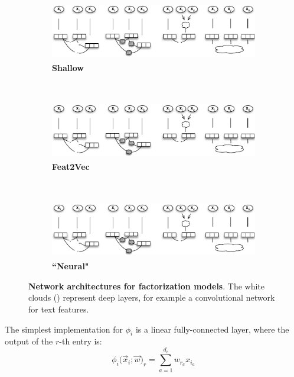 \documentclass{article}
\newcommand{\vect}[1]{\vec{#1}}
\begin{document}
\begin{figure}[th]
    \centering
    \begin{subfigure}[t]{0.26\textwidth}
        \centering
        \includegraphics[height=1in]{img/diagram_mf.pdf}
        \caption{\textbf{Shallow}}
    \end{subfigure}%
    ~
    \begin{subfigure}[t]{0.26\textwidth}
        \centering
        \includegraphics[height=1in]{img/diagram_in.pdf}
        \caption{\textbf{Feat2Vec}}
    \end{subfigure}
    ~
    \begin{subfigure}[t]{0.22\textwidth}
        \centering
        \includegraphics[height=1in]{img/diagram_nmf.pdf}
        \caption{\textbf{``Neural"} \label{fig:neural}}
    \end{subfigure}
    \caption{\textbf{Network architectures for factorization models}.  The  white clouds (\Cloud) represent deep layers, for example a convolutional network for text features.
    \label{fig:architecture}
    }
\end{figure}



The simplest   implementation for $\phi_i$ is a linear fully-connected layer, where the output of the $r$-th entry is:
\begin{equation}
\label{eq:fully_connected}
\phi_i\bigl(\vect{x}_i; \vect{w}\bigr)_r= \sum_{a=1}^{d_i}  w_{r_a} x_{i_a}
\end{equation}
\end{document}
